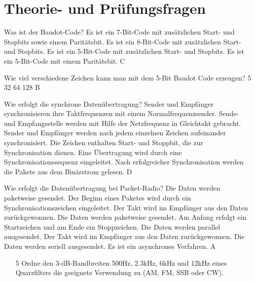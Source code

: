 
\section*{Theorie- und Prüfungsfragen} 

{Was ist der Baudot-Code?}%
{Es ist ein 7-Bit-Code mit zusätzlichen Start- und Stopbits sowie einem Paritätsbit.}%
{Es ist ein 8-Bit-Code mit zusätzlichen Start- und Stopbits.}%
{Es ist ein 5-Bit-Code mit zusätzlichen Start- und Stopbits.}%
{Es ist ein 5-Bit-Code mit einem Paritätsbit.}%
{C}%

{Wie viel verschiedene Zeichen kann man mit dem 5-Bit Baudot Code erzeugen?}%
{5}%
{32}%
{64}%
{128}%
{B}%

{Wie erfolgt die synchrone Datenübertragung?}%
{Sender und Empfänger synchronisieren ihre Taktfrequenzen mit einem Normalfrequenzsender.}%
{Sende- und Empfangsstelle werden mit Hilfe der Netzfrequenz in Gleichtakt gebracht.}%
{Sender und Empfänger werden nach jedem einzelnen Zeichen aufeinander synchronisiert. Die Zeichen enthalten Start- und Stoppbit, die zur Synchronisation dienen.}%
{Eine Übertragung wird durch eine Synchronisationssequenz eingeleitet. Nach erfolgreicher Synchronisation werden die Pakete aus dem Binärstrom gelesen.}%
{D}%

{Wie erfolgt die Datenübertragung bei Packet-Radio?}%
{Die Daten werden paketweise gesendet. Der Beginn eines Paketes wird durch ein Synchronisationszeichen eingeleitet. Der Takt wird im Empfänger aus den Daten zurückgewonnen.}%
{Die Daten werden paketweise gesendet. Am Anfang erfolgt ein Startzeichen und am Ende ein Stoppzeichen.}%
{Die Daten werden parallel ausgesendet. Der Takt wird im Empfänger aus den Daten zurückgewonnen.}%
{Die Daten werden seriell ausgesendet. Es ist ein asynchrones Verfahren.}%
{A}%



\begin{enumerate}
		\item[5] Ordne den 3-dB-Bandbreiten 500Hz, 2.3kHz, 6kHz und 12kHz  eines Quarzfilters die geeignete Verwendung zu (AM, FM, SSB oder CW).\\ 
	\end{enumerate}

